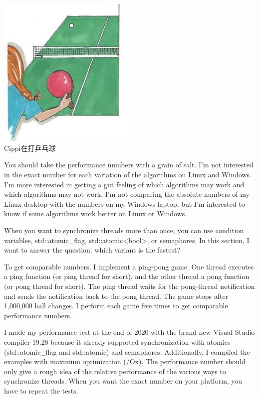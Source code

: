 
\begin{center}
\includegraphics[width=0.5\textwidth]{content/3/chapter7/images/1.png}\\
Cippi在打乒乓球
\end{center}

\begin{tcolorbox}[breakable,enhanced jigsaw,colback=blue!5!white,colframe=blue!75!black,title={The Reference PCs}]
You should take the performance numbers with a grain of salt. I’m not interested in the exact number for each variation of the algorithms on Linux and Windows. I’m more interested in getting a gut feeling of which algorithms may work and which algorithms may not work. I’m not comparing the absolute numbers of my Linux desktop with the numbers on my Windows laptop, but I’m interested to know if some algorithms work better on Linux or Windows.
\end{tcolorbox}

When you want to synchronize threads more than once, you can use condition variables, std::atomic\_flag, std::atomic<bool>, or semaphores. In this section, I want to answer the question: which variant is the fastest?

To get comparable numbers, I implement a ping-pong game. One thread executes a ping function (or ping thread for short), and the other thread a pong function (or pong thread for short). The ping thread waits for the pong-thread notification and sends the notification back to the pong thread. The game stops after 1,000,000 ball changes. I perform each game five times to get comparable performance numbers.

\begin{tcolorbox}[breakable,enhanced jigsaw,colback=blue!5!white,colframe=blue!75!black,title={About the Numbers}]
I made my performance test at the end of 2020 with the brand new Visual Studio compiler 19.28 because it already supported synchronization with atomics (std::atomic\_flag and std::atomic) and semaphores. Additionally, I compiled the examples with maximum optimization (/Ox). The performance number should only give a rough idea of the relative performance of the various ways to synchronize threads. When you want the exact number on your platform, you have to repeat the tests.
\end{tcolorbox}

